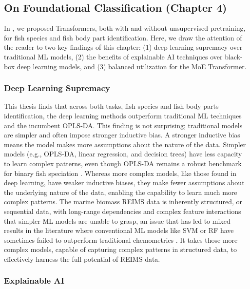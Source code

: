 \subsection{On Foundational Classification (Chapter 4)}

In , we proposed Transformers, both with and without unsupervised pretraining, for fish species and fish body part identification. Here, we draw the attention of the reader to two key findings of this chapter:
(1) deep learning supremacy over traditional ML models,
(2) the benefits of explainable AI techniques over black-box deep learning models,
and (3) balanced utilization for the MoE Transformer.

\subsubsection{Deep Learning Supremacy}

This thesis finds that across both tasks, fish species and fish body parts identification, the deep learning methods outperform traditional ML techniques and the incumbent OPLS-DA. This finding is not surprising; traditional models are simpler and often impose stronger inductive bias. A stronger inductive bias means the model makes more assumptions about the nature of the data. Simpler models (e.g., OPLS-DA, linear regression, and decision trees) have less capacity to learn complex patterns, even though OPLS-DA remains a robust benchmark for binary fish speciation \citep{Black2017, Shen2020, Shen2022}. Whereas more complex models, like those found in deep learning, have weaker inductive biases, they make fewer assumptions about the underlying nature of the data, enabling the capability to learn much more complex patterns. The marine biomass REIMS data is inherently structured, or sequential data, with long-range dependencies and complex feature interactions that simpler ML models are unable to grasp, an issue that has led to mixed results in the literature where conventional ML models like SVM or RF have sometimes failed to outperform traditional chemometrics \citep{De2023}. It takes those more complex models, capable of capturing complex patterns in structured data, to effectively harness the full potential of REIMS data.

\subsubsection{Explainable AI}

